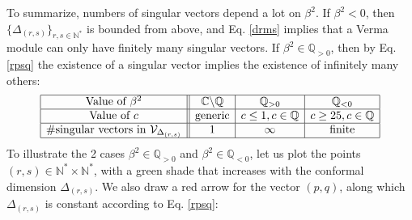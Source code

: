 \documentclass[12pt, a4paper]{article}
\begin{document}
To summarize, numbers of singular vectors depend a lot on $\beta^2$. If $\beta^2<0$, then $\{\Delta_{(r, s)}\}_{r,s\in\mathbb{N}^*}$ is bounded from above, and Eq. \eqref{drms} implies that a Verma module can only have finitely many singular vectors. If $\beta^2\in \mathbb{Q}_{>0}$, then by Eq. \eqref{rpsq} the existence of a singular vector implies the existence of infinitely many others:
\begin{align}
 \begin{array}{|c||c|c|c|}
  \hline 
  \text{Value of }\beta^2 & \mathbb{C}\backslash \mathbb{Q} & \mathbb{Q}_{>0} & \mathbb{Q}_{<0}
  \\
  \hline 
  \text{Value of }c & \text{generic} & c\leq 1 , c\in\mathbb{Q} &  c\geq 25, c\in\mathbb{Q}
  \\
  \hline 
  \#\text{singular vectors in } \mathcal{V}_{\Delta_{(r, s)}} & 1 & \infty & \text{finite}
  \\
  \hline 
 \end{array}
\end{align}
To illustrate the 2 cases $\beta^2\in \mathbb{Q}_{>0}$ and $\beta^2\in \mathbb{Q}_{<0}$, let us plot the points $(r,s)\in \mathbb{N}^*\times \mathbb{N}^*$, with a green shade that increases with the conformal dimension $\Delta_{(r,s)}$. We also draw a red arrow for the vector $(p, q)$, along which $\Delta_{(r,s)}$ is constant according to Eq. \eqref{rpsq}:
\end{document}
